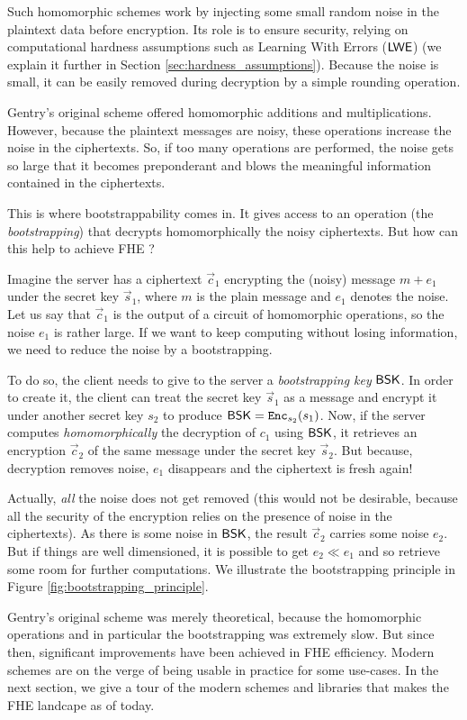 Such homomorphic schemes work by injecting some small random noise in the plaintext data before encryption. Its role is to ensure security, relying on computational hardness assumptions such as Learning With Errors ($\textsf{LWE}$) (we explain it further in Section \ref{sec:hardness_assumptions}). Because the noise is small, it can be easily removed during decryption by a simple rounding operation. 

Gentry's original scheme offered homomorphic additions and multiplications. However, because the plaintext messages are noisy, these operations increase the noise in the ciphertexts. So, if too many operations are performed, the noise gets so large that it becomes preponderant and blows the meaningful information contained in the ciphertexts.

This is where bootstrappability comes in. It gives access to an operation (the \textit{bootstrapping}) that decrypts homomorphically the noisy ciphertexts. But how can this help to achieve FHE ?

Imagine the server has a ciphertext $\vec c_1$ encrypting the (noisy) message $m +e_1$ under the secret key $\vec s_1$, where $m$ is the plain message and $e_1$ denotes the noise. Let us say that $\vec c_1$ is the output of a circuit of homomorphic operations, so the noise $e_1$ is rather large. If we want to keep computing without losing information, we need to reduce the noise by a bootstrapping. 

To do so, the client needs to give to the server a \textit{bootstrapping key} $\textsf{BSK}$. In order to create it, the client can treat the secret key $\vec s_1$ as a message and encrypt it under another secret key $s_2$ to produce $\textsf{BSK} = \texttt{Enc}_{s_2}(s_1)$. Now, if the server computes \textit{homomorphically} the decryption of $c_1$ using $\textsf{BSK}$, it retrieves an encryption $\vec c_2$ of the same message under the secret key $\vec s_2$. But because, decryption removes noise, $e_1$ disappears and the ciphertext is fresh again!

Actually, \textit{all} the noise does not get removed (this would not be desirable, because all the security of the encryption relies on the presence of noise in the ciphertexts). As there is some noise in $\textsf{BSK}$, the result $\vec c_2$ carries some noise $e_2$. But if things are well dimensioned, it is possible to get $e_2 \ll e_1$ and so retrieve some room for further computations. We illustrate the bootstrapping principle in Figure \ref{fig:bootstrapping_principle}.


Gentry's original scheme was merely theoretical, because the homomorphic operations and in particular the bootstrapping was extremely slow. But since then, significant improvements have been achieved in FHE efficiency. Modern schemes are on the verge of being usable in practice for some use-cases. In the next section, we give a tour of the modern schemes and libraries that makes the FHE landcape as of today.



